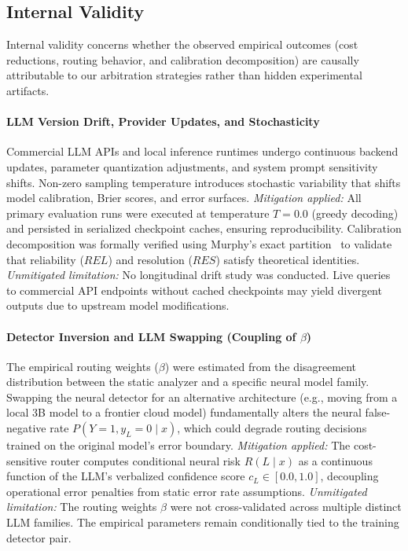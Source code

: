 \subsection{Internal Validity}
Internal validity concerns whether the observed empirical outcomes (cost reductions, routing behavior, and calibration decomposition) are causally attributable to our arbitration strategies rather than hidden experimental artifacts.

\paragraph{LLM Version Drift, Provider Updates, and Stochasticity}
Commercial LLM APIs and local inference runtimes undergo continuous backend updates, parameter quantization adjustments, and system prompt sensitivity shifts. Non-zero sampling temperature introduces stochastic variability that shifts model calibration, Brier scores, and error surfaces.
\textit{Mitigation applied:} All primary evaluation runs were executed at temperature $T=0.0$ (greedy decoding) and persisted in serialized checkpoint caches, ensuring reproducibility. Calibration decomposition was formally verified using Murphy's exact partition~\cite{murphy1973new} to validate that reliability ($REL$) and resolution ($RES$) satisfy theoretical identities.
\textit{Unmitigated limitation:} No longitudinal drift study was conducted. Live queries to commercial API endpoints without cached checkpoints may yield divergent outputs due to upstream model modifications.

\paragraph{Detector Inversion and LLM Swapping (Coupling of $\beta$)}
The empirical routing weights ($\beta$) were estimated from the disagreement distribution between the static analyzer and a specific neural model family. Swapping the neural detector for an alternative architecture (e.g., moving from a local 3B model to a frontier cloud model) fundamentally alters the neural false-negative rate $P(Y=1, y_L=0 \mid x)$, which could degrade routing decisions trained on the original model's error boundary.
\textit{Mitigation applied:} The cost-sensitive router computes conditional neural risk $R(L \mid x)$ as a continuous function of the LLM's verbalized confidence score $c_L \in [0.0, 1.0]$, decoupling operational error penalties from static error rate assumptions.
\textit{Unmitigated limitation:} The routing weights $\beta$ were not cross-validated across multiple distinct LLM families. The empirical parameters remain conditionally tied to the training detector pair.

